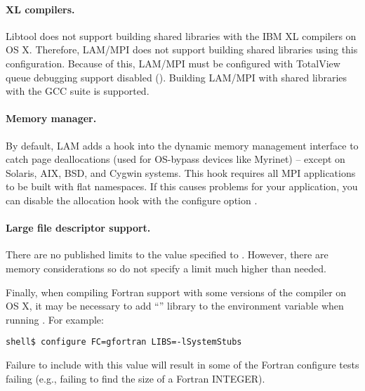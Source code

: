 \paragraph{XL compilers.} Libtool does not support building shared
libraries with the IBM XL compilers on OS X.  Therefore, LAM/MPI does
not support building shared libraries using this configuration.
Because of this, LAM/MPI must be configured with TotalView queue
debugging support disabled ().  Building
LAM/MPI with shared libraries with the GCC suite is supported.

\paragraph{Memory manager.} By default, LAM adds a hook into the
dynamic memory management interface to catch page deallocations (used
for OS-bypass devices like Myrinet) -- except on Solaris, AIX, BSD,
and Cygwin systems.  This hook requires all MPI applications to be
built with flat namespaces.  If this causes problems for your
application, you can disable the allocation hook with the configure
option .

\paragraph{Large file descriptor support.} There are no published
limits to the value specified to .  However,
there are memory considerations so do not specify a limit much higher
than needed.


Finally, when compiling Fortran support with some versions of the
 compiler on OS X, it may be necessary to add
``'' library to the  environment
variable when running .  For example:

\lstset{style=lam-cmdline}
\begin{lstlisting}
shell$ configure FC=gfortran LIBS=-lSystemStubs
\end{lstlisting}

Failure to include  with this value will result in some
of the Fortran configure tests failing (e.g., failing to find the size
of a Fortran INTEGER).

